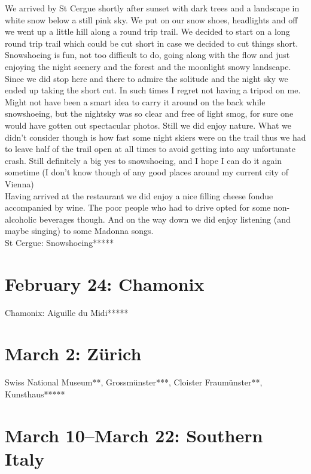 We arrived by St Cergue shortly after sunset with dark trees and a landscape in white snow below a still pink sky. We put on our snow shoes, headlights and off we went up a little hill along a round trip trail. We decided to start on a long round trip trail which could be cut short in case we decided to cut things short. Snowshoeing is fun, not too difficult to do, going along with the flow and just enjoying the night scenery and the forest and the moonlight snowy landscape. Since we did stop here and there to admire the solitude and the night sky we ended up taking the short cut. In such times I regret not having a tripod on me. Might not have been a smart idea to carry it around on the back while snowshoeing, but the nightsky was so clear and free of light smog, for sure one would have gotten out spectacular photos. Still we did enjoy nature. What we didn't consider though is how fast some night skiers were on the trail thus we had to leave half of the trail open at all times to avoid getting into any unfortunate crash. Still definitely a big yes to snowshoeing, and I hope I can do it again sometime (I don't know though of any good places around my current city of Vienna)\\
Having arrived at the restaurant we did enjoy a nice filling cheese fondue accompanied by wine. The poor people who had to drive opted for some non-alcoholic beverages though. And on the way down we did enjoy listening (and maybe singing) to some Madonna songs.\\

St Cergue: Snowshoeing*****

\section{February 24: Chamonix}
\label{Chamonix2019}

Chamonix: Aiguille du Midi*****

\section{March 2: Z\"urich}
\label{Zurich2019}

Swiss National Museum**, Grossm\"unster***, Cloister Fraum\"unster**, Kunsthaus*****

\section{March 10--March 22: Southern Italy}
\label{SouthItaly2019}

